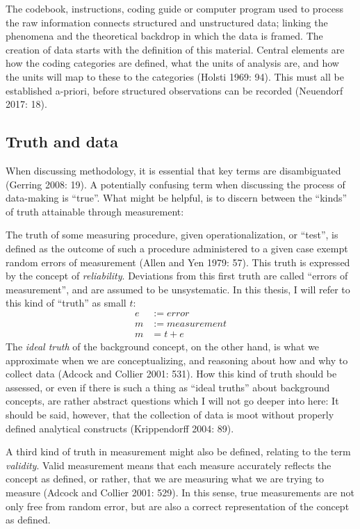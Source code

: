 \documentclass[12pt,twoside]{reedthesis}
\begin{document}
The codebook, instructions, coding guide or computer program used to
process the raw information connects structured and unstructured data;
linking the phenomena and the theoretical backdrop in which the data is
framed. The creation of data starts with the definition of this
material. Central elements are how the coding categories are defined,
what the units of analysis are, and how the units will map to these to
the categories (Holsti 1969: 94). This must all be established a-priori,
before structured observations can be recorded (Neuendorf 2017: 18).

\subsection{Truth and data}\label{truth-and-data}

When discussing methodology, it is essential that key terms are
disambiguated (Gerring 2008: 19). A potentially confusing term when
discussing the process of data-making is ``true''. What might be
helpful, is to discern between the ``kinds'' of truth attainable through
measurement:

The truth of some measuring procedure, given operationalization, or
``test'', is defined as the outcome of such a procedure administered to
a given case exempt random errors of measurement (Allen and Yen 1979:
57). This truth is expressed by the concept of \emph{reliability}.
Deviations from this first truth are called ``errors of measurement'',
and are assumed to be unsystematic. In this thesis, I will refer to this
kind of ``truth'' as small \(t\):
\begin{align*}
e &:= error \\ 
m &:= measurement \\
m &= t + e 
\end{align*}
The \emph{ideal truth} of the background concept, on the other hand, is
what we approximate when we are conceptualizing, and reasoning about how
and why to collect data (Adcock and Collier 2001: 531). How this kind of
truth should be assessed, or even if there is such a thing as ``ideal
truths'' about background concepts, are rather abstract questions which
I will not go deeper into here: It should be said, however, that the
collection of data is moot without properly defined analytical
constructs (Krippendorff 2004: 89).

A third kind of truth in measurement might also be defined, relating to
the term \emph{validity}. Valid measurement means that each measure
accurately reflects the concept as defined, or rather, that we are
measuring what we are trying to measure (Adcock and Collier 2001: 529).
In this sense, true measurements are not only free from random error,
but are also a correct representation of the concept as defined.
\end{document}
